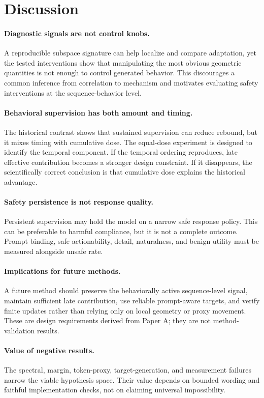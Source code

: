 \section{Discussion}

\paragraph{Diagnostic signals are not control knobs.}
A reproducible subspace signature can help localize and compare adaptation, yet the tested interventions show that manipulating the most obvious geometric quantities is not enough to control generated behavior. This discourages a common inference from correlation to mechanism and motivates evaluating safety interventions at the sequence-behavior level.

\paragraph{Behavioral supervision has both amount and timing.}
The historical \constanttwenty{} contrast shows that sustained supervision can reduce rebound, but it mixes timing with cumulative dose. The equal-dose experiment is designed to identify the temporal component. If the temporal ordering reproduces, late effective contribution becomes a stronger design constraint. If it disappears, the scientifically correct conclusion is that cumulative dose explains the historical advantage.

\paragraph{Safety persistence is not response quality.}
Persistent supervision may hold the model on a narrow safe response policy. This can be preferable to harmful compliance, but it is not a complete outcome. Prompt binding, safe actionability, detail, naturalness, and benign utility must be measured alongside unsafe rate.

\paragraph{Implications for future methods.}
A future method should preserve the behaviorally active sequence-level signal, maintain sufficient late contribution, use reliable prompt-aware targets, and verify finite updates rather than relying only on local geometry or proxy movement. These are design requirements derived from Paper A; they are not method-validation results.

\paragraph{Value of negative results.}
The spectral, margin, token-proxy, target-generation, and measurement failures narrow the viable hypothesis space. Their value depends on bounded wording and faithful implementation checks, not on claiming universal impossibility.
